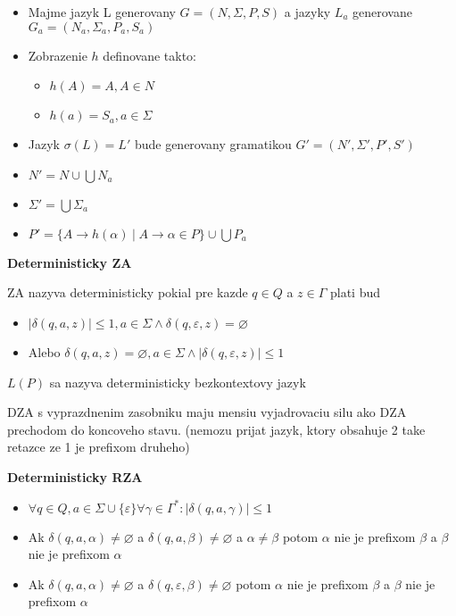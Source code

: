 \documentclass[12pt]{article}
\newcommand{\pipesep}{\hspace{3pt} \vert \hspace{3pt}}
\begin{document}
\begin{itemize}
	\item Majme jazyk L generovany $G = (N,\Sigma,P,S)$ a jazyky $L_{a}$ generovane $G_{a} = (N_{a}, \Sigma_{a}, P_{a}, S_{a})$
	\item Zobrazenie $h$ definovane takto:
		\begin{itemize}
			\item $h(A) = A, A \in N$
			\item $h(a) = S_{a}, a \in \Sigma$
		\end{itemize}
	\item Jazyk $\sigma(L) = L'$ bude generovany gramatikou $G'=(N',\Sigma',P',S')$
	\item $N' = N \cup \bigcup N_{a}$
	\item $\Sigma' = \bigcup \Sigma_{a}$
	\item $P' = \{A \to h(\alpha) \pipesep A \to \alpha \in P\} \cup \bigcup P_{a}$
\end{itemize}

\textbf{Deterministicky ZA}

ZA nazyva deterministicky pokial pre kazde $q \in Q$ a $z \in \Gamma$ plati bud
\begin{itemize}
	\item $|\delta(q,a,z)| \le 1, a \in \Sigma \land \delta(q,\varepsilon,z) = \varnothing$
	\item Alebo $\delta(q,a,z) = \varnothing, a \in \Sigma \land |\delta(q,\varepsilon,z)| \le 1$
\end{itemize}
$L(P)$ sa nazyva deterministicky bezkontextovy jazyk

DZA s vyprazdnenim zasobniku maju mensiu vyjadrovaciu silu ako DZA prechodom do koncoveho stavu. (nemozu prijat
jazyk, ktory obsahuje 2 take retazce ze 1 je prefixom druheho)

\textbf{Deterministicky RZA}
\begin{itemize}
	\item $\forall q \in Q, a \in \Sigma \cup \{\varepsilon\} \forall \gamma \in \Gamma^{*}: |\delta(q,a,\gamma)| \le 1$
	\item Ak $\delta(q,a,\alpha) \not= \varnothing$ a $\delta(q,a,\beta) \not= \varnothing$ a $\alpha \not= \beta$ potom $\alpha$ nie je prefixom $\beta$
		a $\beta$ nie je prefixom $\alpha$
	\item Ak $\delta(q,a,\alpha) \not= \varnothing$ a $\delta(q,\varepsilon,\beta) \not= \varnothing$ potom $\alpha$ nie je prefixom $\beta$
		a $\beta$ nie je prefixom $\alpha$
\end{itemize}
\end{document}

